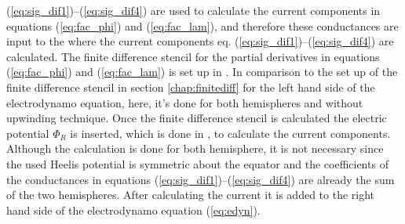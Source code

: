 (\ref{eq:sig_dif1})--(\ref{eq:sig_dif4}) are used to calculate the current 
components in equations (\ref{eq:fac_phi}) and (\ref{eq:fac_lam}), and therefore
these conductances are input to the 
 where the current components eq. 
(\ref{eq:sig_dif1})--(\ref{eq:sig_dif4}) are calculated. 
The finite difference stencil for the partial derivatives in equations 
(\ref{eq:fac_phi}) and (\ref{eq:fac_lam})  is set up in  
. In comparison to the set up of the finite difference 
stencil in section
\ref{chap:finitediff} for the left hand side of the electrodynamo equation, 
here, it's done for both hemispheres and 
without upwinding technique. Once the finite difference stencil is calculated 
the electric
potential $\Phi_R$ is inserted, which is done in , 
to calculate the
current components. Although the calculation is done for both hemisphere, 
it is not necessary since the used Heelis potential
is symmetric about the equator and the coefficients of the conductances in equations 
(\ref{eq:sig_dif1})--(\ref{eq:sig_dif4}) are already the sum of the two
hemispheres. After calculating the current it is added to the right hand side of the
electrodynamo equation (\ref{eq:edyn}).
%
